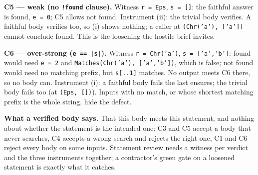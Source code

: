 \documentclass[11pt]{article}
\begin{document}
\begin{answer}
\textbf{C5 --- weak (no \texttt{!found} clause).} Witness \texttt{r = Eps},
\texttt{s = []}: the faithful answer is found, \texttt{e = 0}; C5 allows not
found. Instrument (ii): the trivial body verifies. A faithful body verifies
too, so (i) shows nothing; a caller at \texttt{(Chr('a'), ['a'])} cannot
conclude found. This is the loosening the hostile brief invites.

\textbf{C6 --- over-strong (\texttt{e == |s|}).} Witness \texttt{r = Chr('a')},
\texttt{s = ['a','b']}: found would need \texttt{e = 2} and
\texttt{Matches(Chr('a'), ['a','b'])}, which is false; not found would need no
matching prefix, but \texttt{s[..1]} matches. No output meets C6 there, so no
body can. Instrument (i): a faithful body fails the last ensures; the trivial
body fails too (at \texttt{(Eps, [])}). Inputs with no match, or whose shortest
matching prefix is the whole string, hide the defect.

\textbf{What a verified body says.} That this body meets this statement, and
nothing about whether the statement is the intended one: C3 and C5 accept a
body that never searches, C4 accepts a wrong search and rejects the right one,
C1 and C6 reject every body on some inputs. Statement review needs a witness
per verdict and the three instruments together; a contractor's green gate on
a loosened statement is exactly what it catches.
\end{answer}
\end{document}
